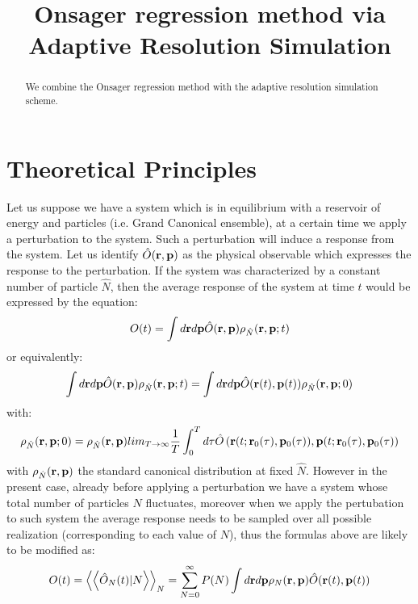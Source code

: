 \documentclass[aps,pre,preprint,unsortedaddress]{revtex4}
\begin{document}
\title{Onsager regression method via Adaptive Resolution Simulation}


\begin{abstract}
We combine the Onsager regression method with the adaptive resolution simulation scheme.
\end{abstract}

\maketitle

\section{Theoretical Principles}
Let us suppose we have a system which is in equilibrium with a reservoir of energy and particles (i.e. Grand Canonical ensemble), at a certain time we apply a perturbation to the system. Such a perturbation will induce a response from the system. Let us identify $\hat{O}({\bf r,p})$ as the physical observable which expresses the response to the perturbation. If the system was characterized by a constant number of particle $\hat{N}$, then the average response of the system at time $t$ would be expressed by the equation:
\begin{equation}
O(t)=\int d{\bf r}d{\bf p} \hat{O}({\bf r,p})\rho_{\hat{N}}({\bf r,p};t)
\label{o1}
\end{equation}
or equivalently:
\begin{equation}
\int d{\bf r}d{\bf p} \hat{O}({\bf r,p})\rho_{\hat{N}}({\bf r,p};t)=\int d{\bf r}d{\bf p} \hat{O}({\bf r}(t),{\bf p}(t))\rho_{\hat{N}}({\bf r,p};0)
\label{o2}
\end{equation}
with:
\begin{equation}
\rho_{\hat{N}}({\bf r,p};0)=\rho_{\hat{N}}({\bf r,p}) lim_{T \to\infty}\frac{1}{T}\int_{0}^{T} d\tau \hat{O}\left({\bf r}(t; {\bf r}_{0}(\tau), {\bf p}_{0}(\tau)),{\bf p}(t;{\bf r}_{0}(\tau), {\bf p}_{0}(\tau)\right)
\label{rhon}
\end{equation} 
with $\rho_{\hat{N}}({\bf r,p})$ the standard canonical distribution at fixed $\hat{N}$. However in the present case, already before applying a perturbation we have a system whose total number of particles $N$ fluctuates, moreover when we apply the pertubation to such system the average response needs to be sampled over all possible realization (corresponding to each value of $N$), thus the formulas above are likely to be modified as:
\begin{equation}
O(t)=\left<\left<\hat{O}_{N}(t)|N\right>\right>_{N}=\sum_{N=0}^{\infty}P(N)\int d{\bf r}d{\bf p}\rho_{N}({\bf r,p})\hat{O}({\bf r}(t),{\bf p}(t))
\label{newvers}
\end{equation}
\end{document}

